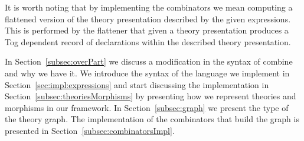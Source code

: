 It is worth noting that by implementing the combinators we mean computing a flattened version of the theory presentation described by the given expressions. This is performed by the flattener that given a theory presentation produces a Tog dependent record of declarations within the described theory presentation. 

In Section~\ref{subsec:overPart} we discuss a modification in the syntax of combine and why we have it. We introduce the syntax of the language we implement in Section~\ref{sec:impl:expressions} and start discussing the implementation in Section~\ref{subsec:theoriesMorphisms} by presenting how we represent theories and morphisms in our framework. In Section~\ref{subsec:graph} we present the type of the theory graph. The implementation of the combinators that build the graph is presented in Section~\ref{subsec:combinatorsImpl}. 

